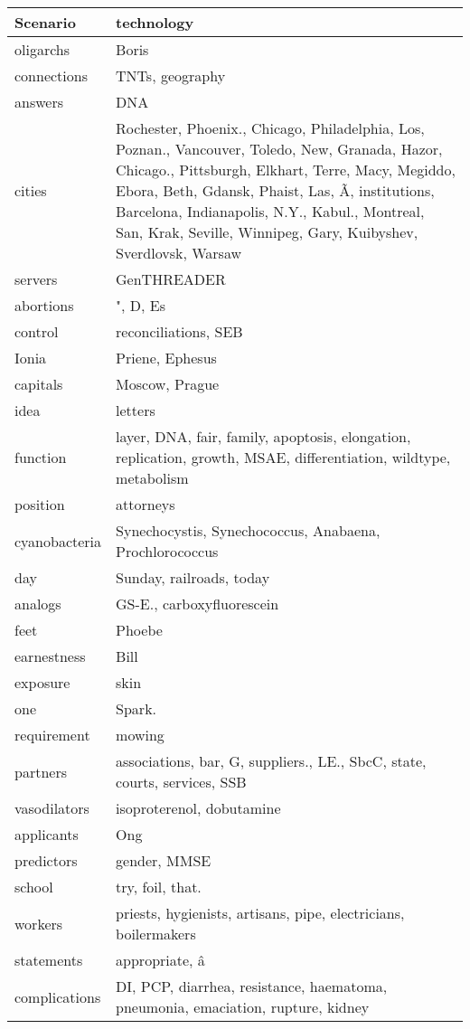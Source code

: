 \begin{longtable}{|l|p{11cm}|}
  \hline
  Scenario & technology \\
  \hline
  oligarchs & Boris \\
  \hline
  connections & TNTs, geography \\
  \hline
  answers & DNA \\
  \hline
  cities & Rochester, Phoenix., Chicago, Philadelphia, Los, Poznan., Vancouver, Toledo, New, Granada, Hazor, Chicago., Pittsburgh, Elkhart, Terre, Macy, Megiddo, Ebora, Beth, Gdansk, Phaist, Las, Ã, institutions, Barcelona, Indianapolis, N.Y., Kabul., Montreal, San, Krak, Seville, Winnipeg, Gary, Kuibyshev, Sverdlovsk, Warsaw \\
  \hline
  servers & GenTHREADER \\
  \hline
  abortions & ", D, Es \\
  \hline
  control & reconciliations, SEB \\
  \hline
  Ionia & Priene, Ephesus \\
  \hline
  capitals & Moscow, Prague \\
  \hline
  idea & letters \\
  \hline
  function & layer, DNA, fair, family, apoptosis, elongation, replication, growth, MSAE, differentiation, wildtype, metabolism \\
  \hline
  position & attorneys \\
  \hline
  cyanobacteria & Synechocystis, Synechococcus, Anabaena, Prochlorococcus \\
  \hline
  day & Sunday, railroads, today \\
  \hline
  analogs & GS-E., carboxyfluorescein \\
  \hline
  feet & Phoebe \\
  \hline
  earnestness & Bill \\
  \hline
  exposure & skin \\
  \hline
  one & Spark. \\
  \hline
  requirement & mowing \\
  \hline
  partners & associations, bar, G, suppliers., LE., SbcC, state, courts, services, SSB \\
  \hline
  vasodilators & isoproterenol, dobutamine \\
  \hline
  applicants & Ong \\
  \hline
  predictors & gender, MMSE \\
  \hline
  school & try, foil, that. \\
  \hline
  workers & priests, hygienists, artisans, pipe, electricians, boilermakers \\
  \hline
  statements & appropriate, â \\
  \hline
  complications & DI, PCP, diarrhea, resistance, haematoma, pneumonia, emaciation, rupture, kidney \\
  \hline
\end{longtable}